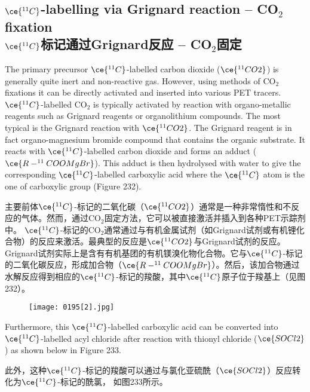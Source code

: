 \documentclass[dvipsnames, svgnames,a4paper,11pt]{article}
\begin{document}
\subsection{\(\ce{^{11}C}\)-labelling via Grignard reaction – CO\(_2\) fixation  \\ \(\ce{^{11}C}\)标记通过Grignard反应 – CO\(_2\)固定}

The primary precursor \(\ce{^{11}C}\)-labelled carbon dioxide (\(\ce{^{11}CO2}\)) is generally quite inert and non-reactive gas. However, using methods of CO\(_2\) fixations it can be directly activated and inserted into various PET tracers. \(\ce{^{11}C}\)-labelled CO\(_2\) is typically activated by reaction with organo-metallic reagents such as Grignard reagents or organolithium compounds. The most typical is the Grignard reaction with \(\ce{^{11}CO2}\). The Grignard reagent is in fact organo-magnesium bromide compound that contains the organic substrate. It reacts with \(\ce{^{11}C}\)-labelled carbon dioxide and forms an adduct (\(\ce{R-^{11}COOMgBr}\)). This adduct is then hydrolysed with water to give the corresponding \(\ce{^{11}C}\)-labelled carboxylic acid where the \(\ce{^{11}C}\) atom is the one of carboxylic group (Figure 232).  

主要前体\(\ce{^{11}C}\)-标记的二氧化碳（\(\ce{^{11}CO2}\)）通常是一种非常惰性和不反应的气体。然而，通过CO\(_2\)固定方法，它可以被直接激活并插入到各种PET示踪剂中。 \(\ce{^{11}C}\)-标记的CO\(_2\)通常通过与有机金属试剂（如Grignard试剂或有机锂化合物）的反应来激活。最典型的反应是\(\ce{^{11}CO2}\)与Grignard试剂的反应。Grignard试剂实际上是含有有机基团的有机镁溴化物化合物。它与\(\ce{^{11}C}\)-标记的二氧化碳反应，形成加合物（\(\ce{R-^{11}COOMgBr}\)）。然后，该加合物通过水解反应得到相应的\(\ce{^{11}C}\)-标记的羧酸，其中\(\ce{^{11}C}\)原子位于羧基上（见图232）。  
\begin{figure}[h]
	\centering
    \texttt{[image: 0195[2].jpg]}  
     \label{fig232}
\end{figure}
Furthermore, this \(\ce{^{11}C}\)-labelled carboxylic acid can be converted into \(\ce{^{11}C}\)-labelled acyl chloride after reaction with thionyl chloride (\(\ce{SOCl2}\)) as shown below in Figure 233.  

此外，这种\(\ce{^{11}C}\)-标记的羧酸可以通过与氯化亚硫酰（\(\ce{SOCl2}\)）反应转化为\(\ce{^{11}C}\)-标记的酰氯， 如图233所示。  
\end{document}
